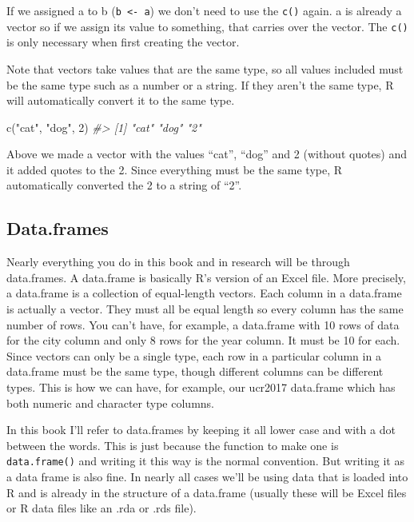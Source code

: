 \documentclass[
]{krantz}
\makeatletter
\newenvironment{Shaded}{\begin{snugshade}}{\end{snugshade}}
\newcommand{\CommentTok}[1]{\textcolor[rgb]{0.37,0.37,0.37}{\textit{#1}}}
\newcommand{\DecValTok}[1]{\textcolor[rgb]{0.06,0.06,0.06}{#1}}
\newcommand{\FunctionTok}[1]{\textcolor[rgb]{0,0,0}{#1}}
\newcommand{\NormalTok}[1]{#1}
\newcommand{\StringTok}[1]{\textcolor[rgb]{0.5,0.5,0.5}{#1}}
\newenvironment{kframe}{%
\medskip{}
\setlength{\fboxsep}{.8em}
 \def\at@end@of@kframe{}%
 \ifinner\ifhmode%
  \def\at@end@of@kframe{\end{minipage}}%
  \begin{minipage}{\columnwidth}%
 \fi\fi%
 \def\FrameCommand##1{\hskip\@totalleftmargin \hskip-\fboxsep
 \colorbox{shadecolor}{##1}\hskip-\fboxsep
     \hskip-\linewidth \hskip-\@totalleftmargin \hskip\columnwidth}%
 \MakeFramed {\advance\hsize-\width
   \@totalleftmargin\z@ \linewidth\hsize
   \@setminipage}}%
 {\par\unskip\endMakeFramed%
 \at@end@of@kframe}
\renewenvironment{Shaded}{\begin{kframe}}{\end{kframe}}
\makeatother
\begin{document}
If we assigned a to b (\texttt{b\ \textless{}-\ a}) we don't
need to use the \texttt{c()} again. a is already a vector so
if we assign its value to something, that carries over the
vector. The \texttt{c()} is only necessary when first
creating the vector.

Note that vectors take values that are the same type, so all
values included must be the same type such as a number or a
string. If they aren't the same type, R will automatically
convert it to the same type.

\begin{Shaded}
\begin{Highlighting}[]
\FunctionTok{c}\NormalTok{(}\StringTok{"cat"}\NormalTok{, }\StringTok{"dog"}\NormalTok{, }\DecValTok{2}\NormalTok{)}
\CommentTok{\#\textgreater{} [1] "cat" "dog" "2"}
\end{Highlighting}
\end{Shaded}

Above we made a vector with the values ``cat'', ``dog'' and
2 (without quotes) and it added quotes to the 2. Since
everything must be the same type, R automatically converted
the 2 to a string of ``2''.

\hypertarget{dataframes}{%
\subsection{Data.frames}\label{dataframes}}

Nearly everything you do in this book and in research will
be through data.frames. A data.frame is basically R's
version of an Excel file. More precisely, a data.frame is a
collection of equal-length vectors. Each column in a
data.frame is actually a vector. They must all be equal
length so every column has the same number of rows. You
can't have, for example, a data.frame with 10 rows of data
for the city column and only 8 rows for the year column. It
must be 10 for each. Since vectors can only be a single
type, each row in a particular column in a data.frame must
be the same type, though different columns can be different
types. This is how we can have, for example, our ucr2017
data.frame which has both numeric and character type
columns.

In this book I'll refer to data.frames by keeping it all
lower case and with a dot between the words. This is just
because the function to make one is \texttt{data.frame()}
and writing it this way is the normal convention. But
writing it as a data frame is also fine. In nearly all cases
we'll be using data that is loaded into R and is already in
the structure of a data.frame (usually these will be Excel
files or R data files like an .rda or .rds file).
\end{document}
